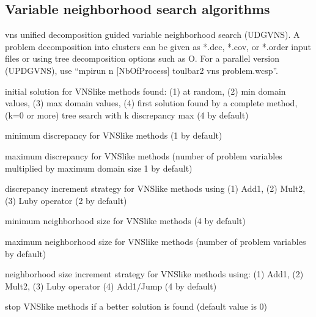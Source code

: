 \documentclass[letterpaper,10pt,openany,oneside,english]{sphinxmanual}
\begin{document}
\subsection{Variable neighborhood search algorithms}
\label{\detokenize{userdoc:variable-neighborhood-search-algorithms}}\begin{optionlist}{3cm}
\item [\sphinxhyphen{}vns]  
\sphinxAtStartPar
unified decomposition guided variable neighborhood search
 (UDGVNS). A problem decomposition into clusters can be
given as *.dec, *.cov, or *.order input files or using tree
decomposition options such as \sphinxhyphen{}O. For a parallel version (UPDGVNS),
use “mpirun \sphinxhyphen{}n {[}NbOfProcess{]} toulbar2 \sphinxhyphen{}vns problem.wcsp”.
\end{optionlist}
\begin{description}
\sphinxAtStartPar
initial solution for VNS\sphinxhyphen{}like methods found: (\sphinxhyphen{}1) at random, (\sphinxhyphen{}2) min domain values, (\sphinxhyphen{}3) max domain values, (\sphinxhyphen{}4) first solution found by a complete method, (k=0 or more) tree search with k discrepancy max (\sphinxhyphen{}4 by default)

\sphinxAtStartPar
minimum discrepancy for VNS\sphinxhyphen{}like methods (1 by default)

\sphinxAtStartPar
maximum discrepancy for VNS\sphinxhyphen{}like methods (number of problem variables multiplied by maximum domain size \sphinxhyphen{}1 by default)

\sphinxAtStartPar
discrepancy increment strategy for VNS\sphinxhyphen{}like methods using (1) Add1, (2) Mult2, (3) Luby operator (2 by default)

\sphinxAtStartPar
minimum neighborhood size for VNS\sphinxhyphen{}like methods (4 by default)

\sphinxAtStartPar
maximum neighborhood size for VNS\sphinxhyphen{}like methods (number of problem variables by default)

\sphinxAtStartPar
neighborhood size increment strategy for VNS\sphinxhyphen{}like methods using: (1) Add1, (2) Mult2, (3) Luby operator (4) Add1/Jump (4 by default)

\sphinxAtStartPar
stop VNS\sphinxhyphen{}like methods if a better solution is found (default value is 0)

\end{description}
\end{document}
